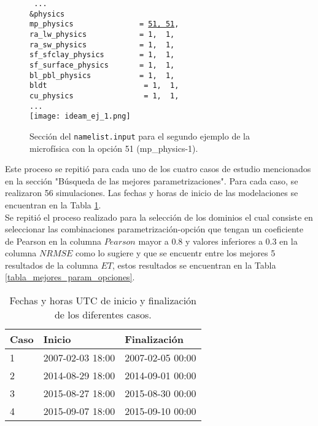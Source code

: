 \begin{itemize}
\begin{figure}[H]
\center
\texttt{
...\\
\&physics\\
mp\_physics~~~~~~~~~~~~~~~=~\underline{51,~51},\\
ra\_lw\_physics~~~~~~~~~~~~=~1,~~1,\\
ra\_sw\_physics~~~~~~~~~~~~=~1,~~1,\\
sf\_sfclay\_physics~~~~~~~~=~1,~~1,\\
sf\_surface\_physics~~~~~~~=~1,~~1,\\
bl\_pbl\_physics~~~~~~~~~~~=~1,~~1,\\
bldt~~~~~~~~~~~~~~~~~~~~~~=~1,~~1,\\
cu\_physics~~~~~~~~~~~~~~~~=~1,~~1,\\
...\\
}
\centering
\texttt{[image: ideam\_ej\_1.png]}
\caption{Sección del \texttt{namelist.input} para el segundo ejemplo de la microfísica con la opción 51 (mp\_physics-1).}
\label{imag_tab_ej3}

\end{figure}





Este proceso se repitió para cada uno de los cuatro casos de estudio mencionados en la sección "Búsqueda de las mejores parametrizaciones". Para cada caso, se realizaron 56 simulaciones. Las fechas y horas de inicio de las modelaciones se encuentran en la Tabla \ref{tabla_inicio_fin_casos}.\\
 
Se repitió el proceso realizado para la selección de los dominios el cual consiste en seleccionar las combinaciones parametrización-opción que tengan un coeficiente de Pearson en la columna  $Pearson$ mayor a 0.8 y valores inferiores a 0.3 en la columna $NRMSE$ como lo sugiere \citet{Agua2016} y que se encuentr entre los mejores 5 resultados de la columna $ET$, estos resultados se encuentran en la Tabla \ref{tabla_mejores_param_opciones}.

 
 
 \begin{table}[H]
 \centering
 \caption{Fechas y horas UTC de inicio y finalización de los diferentes casos.}
 \label{tabla_inicio_fin_casos}
\begin{tabular}{lll}
Caso & Inicio & Finalización \\ \hline
1 & 2007-02-03 18:00 & 2007-02-05 00:00 \\
2 & 2014-08-29 18:00 & 2014-09-01 00:00 \\
3 & 2015-08-27 18:00 & 2015-08-30 00:00 \\
4 & 2015-09-07 18:00 & 2015-09-10 00:00 \\
\end{tabular}
\end{table}



\end{itemize}
